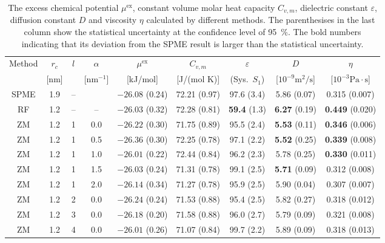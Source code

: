 \documentclass[aip,jcp,a4paper,reprint,unsortedaddress,onecolumn,fleqn]{revtex4-1}
\newcommand{\eps}{\varepsilon}
\newcommand{\exc}{\textrm{ex}}
\newcommand{\systemsb}{S_1}
\begin{document}
\begin{table}
  \centering
  \caption{The excess chemical potential $\mu^\exc$, constant volume molar heat capacity $C_{v,m}$, dielectric constant $\eps$, diffusion constant $D$ and viscosity $\eta$
    calculated by different methods.    
    The parenthesises in the last column show the statistical uncertainty
    at the confidence level of 95~\%.
    The bold numbers indicating that its deviation from the SPME result is larger than the statistical uncertainty.
  }
  \begin{tabular*}{0.95\textwidth}{@{\extracolsep{\fill}}cccc ccccc}\hline\hline
    Method      &   $r_c$ &    $l$ & $\alpha$  & $\mu^\exc$  &$C_{v,m}$ &  $\eps$ & $D$ &  $\eta$ \\
                &    [nm] &        & [$\textrm{nm}^{-1}$] &   [kJ/mol] &[J/(mol K)] & (Sys.~$\systemsb$) & [$10^{-9}\textrm{m}^2/\textrm{s}$] &  [$10^{-3}\textrm{Pa}\cdot\textrm{s}$] \\\hline
    SPME        &1.9 & -- &    & $-26.08$ (0.24) & 72.21 (0.97)  & 97.6 (3.4)  & 5.86 (0.07)   & 0.315 (0.007)\\
    RF          &1.2 & -- &--  & $-26.03$ (0.32) & 72.28 (0.81)  & \textbf{59.4} (1.3)  & \textbf{6.27} (0.19)   & \textbf{0.449} (0.020)\\\hline
    ZM          &1.2 & 1  &0.0 & $-26.22$ (0.30) & 71.75 (0.89)  & 95.5 (2.4)  & \textbf{5.53} (0.11)   & \textbf{0.346} (0.006)\\ 
    ZM          &1.2 & 1  &0.5 & $-26.36$ (0.30) & 72.25 (0.78)  & 97.1 (2.2)  & \textbf{5.52} (0.25)   & \textbf{0.339} (0.008)\\ 
    ZM          &1.2 & 1  &1.0 & $-26.01$ (0.22) & 72.44 (0.84)  & 96.2 (2.3)  &        {5.78} (0.25)   & \textbf{0.330} (0.011)\\ 
    ZM          &1.2 & 1  &1.5 & $-26.03$ (0.24) & 71.31 (0.78)  & 99.1 (2.5)  & \textbf{5.71} (0.09)   &        {0.312} (0.008)\\ 
    ZM          &1.2 & 1  &2.0 & $-26.14$ (0.34) & 71.27 (0.78)  & 95.9 (2.5)  &        {5.90} (0.04)   &        {0.307} (0.007)\\ \hline
    ZM          &1.2 & 2  &0.0 & $-26.24$ (0.24) & 71.53 (0.88)  & 95.4 (2.5)  & 5.82 (0.27)   & 0.318 (0.012)\\ 
    ZM          &1.2 & 3  &0.0 & $-{26.18}$ (0.20) & 71.58 (0.88)  & 96.0 (2.7)  & 5.79 (0.09)   & 0.321 (0.008)\\ 
    ZM          &1.2 & 4  &0.0 & $-{26.01}$ (0.26) & 71.07 (0.84)  & 99.7 (2.2)  & 5.89 (0.09)   & 0.318 (0.013)\\
    \hline\hline
  \end{tabular*}
  \label{tab:tmp3}
\end{table}
\end{document}
